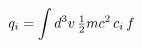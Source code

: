 \documentclass[preview]{standalone}
\begin{document}
\begin{align*}
\special{dvisvgm:raw <g id='unique000'>}q_i=\int d^3v\,\tfrac12 mc^2\,c_i\,f\special{dvisvgm:raw </g>}
\end{align*}
\end{document}
